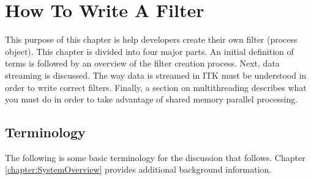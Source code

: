 \chapter{How To Write A Filter}
\label{chapter:WriteAFilter}

This purpose of this chapter is help developers create their own
filter (process object).  This chapter is divided into four major
parts. An initial definition of terms is followed by an overview of
the filter creation process. Next, data streaming is discussed. The
way data is streamed in ITK must be understood in order to write
correct filters. Finally, a section on multithreading describes what
you must do in order to take advantage of shared memory parallel
processing.

\section{Terminology}
\label{sec:Terminology}

The following is some basic terminology for the discussion that follows.
Chapter \ref{chapter:SystemOverview} provides additional background
information.

